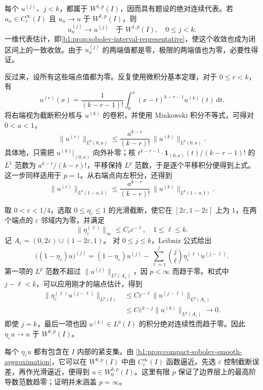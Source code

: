 \begin{solution}
每个 \(u^{(j)}\)、\(j<k\)，都属于 \(W^{1,p}(I)\)，因而具有题设的绝对连续代表。若 \(u_n\in C_c^\infty(I)\) 且 \(u_n\to u\) 于 \(W^{k,p}(I)\)，则
\[
 u_n^{(j)}\longrightarrow u^{(j)}
       \quad\text{于 }W^{1,p}(I),\quad 0\le j<k.
\]
一维代表估计，即\cref{b1:prop:sobolev-interval-representative}，使这个收敛也成为闭区间上的一致收敛。由于 \(u_n^{(j)}\) 的两端值都是零，极限的两端值也为零，必要性得证。

反过来，设所有这些端点值都为零。反复使用微积分基本定理，对于 \(0\le r<k\)，有
\[
 u^{(r)}(x)=\frac1{(k-r-1)!}
             \int_0^x(x-t)^{k-r-1}u^{(k)}(t)\,\mathrm dt.
\]
将右端视为截断积分核与 \(u^{(k)}\) 的卷积，并使用 Minkowski 积分不等式，可得对 \(0<a<1\)，
\[
 \|u^{(r)}\|_{L^p(0,a)}
 \le\frac{a^{k-r}}{(k-r)!}\,
             \|u^{(k)}\|_{L^p(0,a)}.
\]
具体地，只需把 \(u^{(k)}|_{(0,a)}\) 向外补零；核
\(t^{k-r-1}\cdot\mathbf1_{(0,a)}(t)/(k-r-1)!\) 的 \(L^1\) 范数为
\(a^{k-r}/(k-r)!\)，平移保持 \(L^p\) 范数，于是逐个平移积分便得到上式。这一步同样适用于 \(p=1\)。从右端点向左积分，还得到
\[
 \|u^{(r)}\|_{L^p(1-a,1)}
 \le\frac{a^{k-r}}{(k-r)!}\,
             \|u^{(k)}\|_{L^p(1-a,1)}.
\]

取 \(0<\varepsilon<1/4\)，选取 \(0\le\eta_\varepsilon\le1\) 的光滑截断，使它在
\([2\varepsilon,1-2\varepsilon]\) 上为 \(1\)，在两个端点的 \(\varepsilon\) 邻域内为零，并满足
\[
 \|\eta_\varepsilon^{(\ell)}\|_\infty
          \le C_\ell\varepsilon^{-\ell},\quad 1\le\ell\le k.
\]
记 \(A_\varepsilon=(0,2\varepsilon)\cup(1-2\varepsilon,1)\)。
对 \(0\le j\le k\)，Leibniz 公式给出
\[
 \bigl((1-\eta_\varepsilon)u\bigr)^{(j)}
 =(1-\eta_\varepsilon)u^{(j)}
  -\sum_{\ell=1}^j\binom j\ell
           \eta_\varepsilon^{(\ell)}u^{(j-\ell)}.
\]
第一项的 \(L^p\) 范数不超过
\(\|u^{(j)}\|_{L^p(A_\varepsilon)}\)，因 \(p<\infty\) 而趋于零。和式中
\(j-\ell<k\)，可以应用刚才的端点估计，得到
\[
 \begin{aligned}
 \|\eta_\varepsilon^{(\ell)}u^{(j-\ell)}\|_{L^p(I)}
 &\le C\varepsilon^{-\ell}
       \|u^{(j-\ell)}\|_{L^p(A_\varepsilon)}\\
 &\le C\varepsilon^{k-j}
       \|u^{(k)}\|_{L^p(A_\varepsilon)}
 \longrightarrow0.
 \end{aligned}
\]
即使 \(j=k\)，最后一项也因 \(u^{(k)}\in L^p(I)\) 的积分绝对连续性而趋于零。因此
\(\eta_\varepsilon u\to u\) 于 \(W^{k,p}(I)\)。

每个 \(\eta_\varepsilon u\) 都有包含在 \(I\) 内部的紧支集。由%
\cref{b1:prop:compact-sobolev-smooth-approximation}，它可以在 \(W^{k,p}(I)\) 中由
\(C_c^\infty(I)\) 函数逼近。先选 \(\varepsilon\) 控制截断误差，再作光滑逼近，便得到
\(u\in W_0^{k,p}(I)\)。这里有限 \(p\) 保证了边界层上的最高阶导数范数趋零；证明并未涵盖 \(p=\infty\)。
\end{solution}


